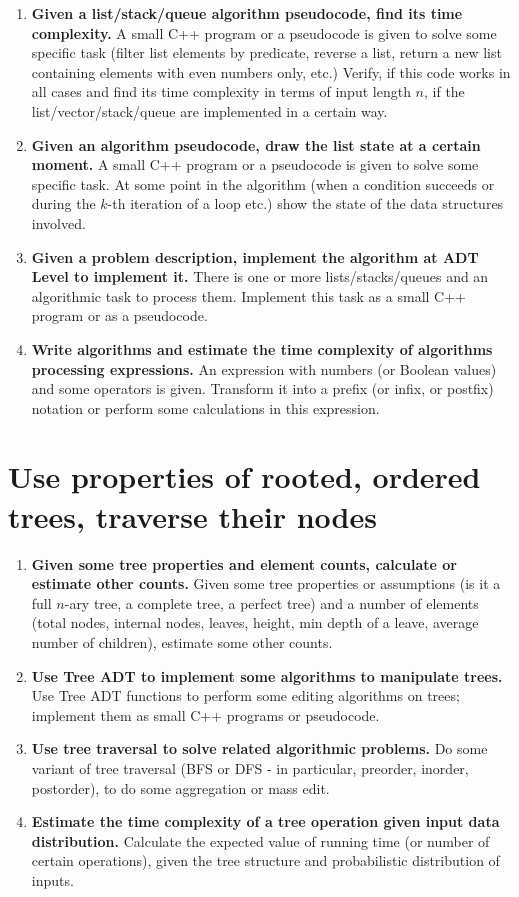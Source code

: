 \documentclass[a4paper,12pt]{article}
\begin{document}
\begin{enumerate}[label=1.\Alph*.]
\item {\bf Given a list/stack/queue algorithm pseudocode, find its time complexity.}
A small C++ program or a pseudocode is given to solve some specific task (filter list elements by predicate, 
reverse a list, return a new list containing elements with even numbers only, etc.)
Verify, if this code works in all cases and find its time complexity in terms of 
input length $n$, if the list/vector/stack/queue are implemented in a certain way.
\item {\bf Given an algorithm pseudocode, draw the list state at a certain moment.}
A small C++ program or a pseudocode is given to solve some specific task. At some point in the algorithm 
(when a condition succeeds or during the $k$-th iteration of a loop etc.) 
show the state of the data structures involved.
\item {\bf Given a problem description, implement the algorithm at ADT Level to implement it.}
There is one or more lists/stacks/queues and an algorithmic task to process them. 
Implement this task as a small C++ program or as a pseudocode.
\item {\bf Write algorithms and estimate the time complexity of algorithms processing expressions.}
An expression with numbers (or Boolean values) and some operators is given. 
Transform it into a prefix (or infix, or postfix) notation or perform some calculations in this expression.
\end{enumerate}


\section{Use properties of rooted, ordered trees, traverse their nodes}

\begin{enumerate}[label=2.\Alph*.]
\item {\bf Given some tree properties and element counts, calculate or estimate other counts.}
Given some tree properties or assumptions (is it a full $n$-ary tree, a complete tree, a perfect tree)
and a number of elements (total nodes, internal nodes, leaves, height, min depth of a leave, 
average number of children), estimate some other counts.
\item {\bf Use Tree ADT to implement some algorithms to manipulate trees.}
Use Tree ADT functions to perform some editing algorithms on trees; 
implement them as small C++ programs or pseudocode.
\item {\bf Use tree traversal to solve related algorithmic problems.} 
Do some variant of tree traversal (BFS or DFS - in particular, preorder, inorder, postorder), 
to do some aggregation or mass edit.
\item {\bf Estimate the time complexity of a tree operation given input data distribution.}
Calculate the expected value of running time (or number of certain operations), 
given the tree structure and probabilistic distribution of inputs. 
\end{enumerate}
\end{document}
